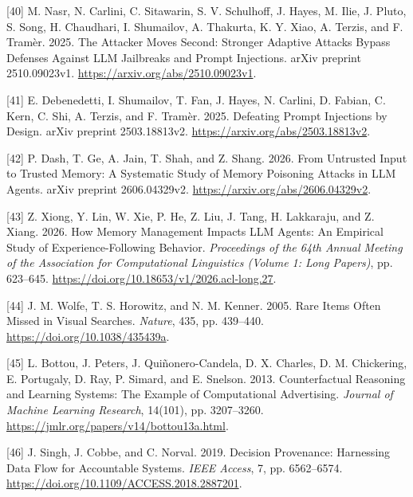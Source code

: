 \documentclass[
  11pt,
]{article}
\newlength{\cslhangindent}
\newlength{\cslentryspacingunit} %
\newenvironment{CSLReferences}[2] %
 {%
  \setlength{\parindent}{0pt}
  \ifodd #1
  \let\oldpar\par
  \def\par{\hangindent=\cslhangindent\oldpar}
  \fi
  \setlength{\parskip}{#2\cslentryspacingunit}
 }%
 {}
\begin{document}
\begin{CSLReferences}{1}{1}
\leavevmode{}%
{[}40{]} M. Nasr, N. Carlini, C. Sitawarin, S. V. Schulhoff, J. Hayes,
M. Ilie, J. Pluto, S. Song, H. Chaudhari, I. Shumailov, A. Thakurta, K.
Y. Xiao, A. Terzis, and F. Tramèr. 2025. The Attacker Moves Second:
Stronger Adaptive Attacks Bypass Defenses Against LLM Jailbreaks and
Prompt Injections. arXiv preprint 2510.09023v1.
\url{https://arxiv.org/abs/2510.09023v1}.

\leavevmode{}%
{[}41{]} E. Debenedetti, I. Shumailov, T. Fan, J. Hayes, N. Carlini, D.
Fabian, C. Kern, C. Shi, A. Terzis, and F. Tramèr. 2025. Defeating
Prompt Injections by Design. arXiv preprint 2503.18813v2.
\url{https://arxiv.org/abs/2503.18813v2}.

\leavevmode{}%
{[}42{]} P. Dash, T. Ge, A. Jain, T. Shah, and Z. Shang. 2026. From
Untrusted Input to Trusted Memory: A Systematic Study of Memory
Poisoning Attacks in LLM Agents. arXiv preprint 2606.04329v2.
\url{https://arxiv.org/abs/2606.04329v2}.

\leavevmode{}%
{[}43{]} Z. Xiong, Y. Lin, W. Xie, P. He, Z. Liu, J. Tang, H. Lakkaraju,
and Z. Xiang. 2026. How Memory Management Impacts LLM Agents: An
Empirical Study of Experience-Following Behavior. \emph{Proceedings of
the 64th Annual Meeting of the Association for Computational Linguistics
(Volume 1: Long Papers)}, pp. 623--645.
\url{https://doi.org/10.18653/v1/2026.acl-long.27}.

\leavevmode{}%
{[}44{]} J. M. Wolfe, T. S. Horowitz, and N. M. Kenner. 2005. Rare Items
Often Missed in Visual Searches. \emph{Nature}, 435, pp. 439--440.
\url{https://doi.org/10.1038/435439a}.

\leavevmode{}%
{[}45{]} L. Bottou, J. Peters, J. Quiñonero-Candela, D. X. Charles, D.
M. Chickering, E. Portugaly, D. Ray, P. Simard, and E. Snelson. 2013.
Counterfactual Reasoning and Learning Systems: The Example of
Computational Advertising. \emph{Journal of Machine Learning Research},
14(101), pp. 3207--3260.
\url{https://jmlr.org/papers/v14/bottou13a.html}.

\leavevmode{}%
{[}46{]} J. Singh, J. Cobbe, and C. Norval. 2019. Decision Provenance:
Harnessing Data Flow for Accountable Systems. \emph{IEEE Access}, 7, pp.
6562--6574. \url{https://doi.org/10.1109/ACCESS.2018.2887201}.


\end{CSLReferences}
\end{document}
